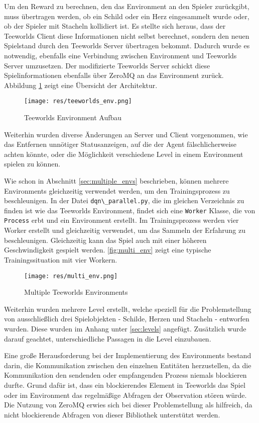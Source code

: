 \documentclass[11pt]{scrartcl}
\begin{document}
\noindent
Um den Reward zu berechnen, den das Environment an den Spieler zurückgibt, muss
übertragen werden, ob ein Schild oder ein Herz eingesammelt wurde oder, ob der Spieler mit
Stacheln kollidiert ist. Es stellte sich heraus, dass der Teeworlds Client diese Informationen
nicht selbst berechnet, sondern den neuen Spielstand durch den Teeworlds Server übertragen bekommt.
Dadurch wurde es notwendig, ebenfalls eine Verbindung zwischen Environment und Teeworlds Server
umzusetzen. Der modifizierte Teeworlds Server schickt diese Spielinformationen ebenfalls über
ZeroMQ an das Environment zurück. Abbildung \ref{fig:teeworlds_env} zeigt eine Übersicht der
Architektur.
\begin{figure}[htp]
  \centering
  \texttt{[image: res/teeworlds\_env.png]}
  \caption{Teeworlds Environment Aufbau}
  \label{fig:teeworlds_env}
\end{figure}
\noindent
Weiterhin wurden diverse Änderungen an Server und Client vorgenommen, wie das Entfernen
unnötiger Statusanzeigen, auf die der Agent fälschlicherweise achten könnte, oder die
Möglichkeit verschiedene Level in einem Environment spielen zu können.

Wie schon in Abschnitt \ref{sec:multiple_envs} beschrieben, können mehrere Environments
gleichzeitig verwendet werden, um den Trainingsprozess zu beschleunigen. In der Datei
\lstinline!dqn\_parallel.py!, die im gleichen Verzeichnis zu finden ist wie das Teeworlds
Environment, findet sich eine \lstinline!Worker! Klasse, die von \lstinline!Process! erbt
und ein Environment erstellt. Im Trainingsprozess werden vier Worker erstellt und
gleichzeitig verwendet, um das Sammeln der Erfahrung zu beschleunigen. Gleichzeitig kann
das Spiel auch mit einer höheren Geschwindigkeit gespielt werden. \autoref{fig:multi_env}
zeigt eine typische Trainingssituation mit vier Workern.
\begin{figure}[htp]
  \centering
  \texttt{[image: res/multi\_env.png]}
  \caption{Multiple Teeworlds Environments}
  \label{fig:multi_env}
\end{figure}
\noindent

Weiterhin wurden mehrere Level erstellt, welche speziell für die Problemstellung von
ausschließlich drei Spielobjekten - Schilde, Herzen und Stacheln - entworfen wurden.
Diese wurden im Anhang unter \autoref{sec:levels} angefügt. Zusätzlich wurde darauf
geachtet, unterschiedliche Passagen in die Level einzubauen.

Eine große Herausforderung bei der Implementierung des Environments bestand darin, die
Kommunikation zwischen den einzelnen Entitäten herzustellen, da die Kommunikation den
sendenden oder empfangenden Prozess niemals blockieren durfte. Grund dafür ist, dass
ein blockierendes Element in Teeworlds das Spiel oder im Environment das regelmäßige
Abfragen der Observation stören würde. Die Nutzung von ZeroMQ erwies sich bei dieser
Problemstellung als hilfreich, da nicht blockierende Abfragen von dieser Bibliothek
unterstützt werden.
\end{document}
